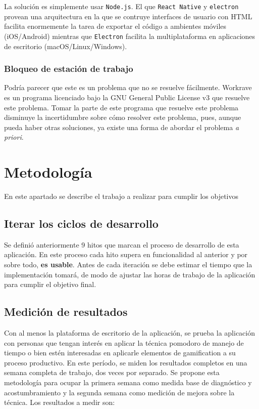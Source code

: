 \documentclass[12pt,letterpaper]{report}
\begin{document}
La solución es simplemente usar \texttt{Node.js}. El que \texttt{React Native}
y \texttt{electron} provean una arquitectura en la que se contruye interfaces
de usuario con HTML facilita enormemente la tarea de exportar el código a
ambientes móviles (iOS/Android) mientras que \texttt{Electron} facilita la
multiplataforma en aplicaciones de escritorio (macOS/Linux/Windows).

\subsubsection{Bloqueo de estación de trabajo}\label{bloqueo-de-estacion-de-trabajo}

Podría parecer que este es un problema que no se resuelve fácilmente. Workrave es un programa licenciado bajo la GNU
General Public License v3 que resuelve este problema. Tomar la parte de este programa que resuelve este problema
disminuye la incertidumbre sobre cómo resolver este problema, pues, aunque pueda haber otras soluciones, ya existe una
forma de abordar el problema \emph{a priori}.

\newpage
\section{Metodología}\label{metodologuxeda}

En este apartado se describe el trabajo a realizar para cumplir los
objetivos

\subsection{Iterar los ciclos de desarrollo}\label{iterar-los-ciclos-de-desarrollo}

Se definió anteriormente 9 hitos que marcan el proceso de desarrollo de esta aplicación. En este proceso cada hito
supera en funcionalidad al anterior y por sobre todo, \textbf{es usable}. Antes de cada iteración se debe estimar el
tiempo que la implementación tomará, de modo de ajustar las horas de trabajo de la aplicación para cumplir el objetivo
final.

\subsection{Medición de resultados}\label{mediciuxf3n-de-resultados-1}

Con al menos la plataforma de escritorio de la aplicación, se prueba la aplicación con personas que tengan interés en
aplicar la técnica pomodoro de manejo de tiempo o bien estén interesadas en aplicarle elementos de gamification a su
proceso productivo. En este período, se miden los resultados completos en una semana completa de trabajo, dos veces por
separado. Se propone esta metodología para ocupar la primera semana como medida base de diagnóstico y acostumbramiento
y la segunda semana como medición de mejora sobre la técnica. Los resultados a medir son:
\end{document}

